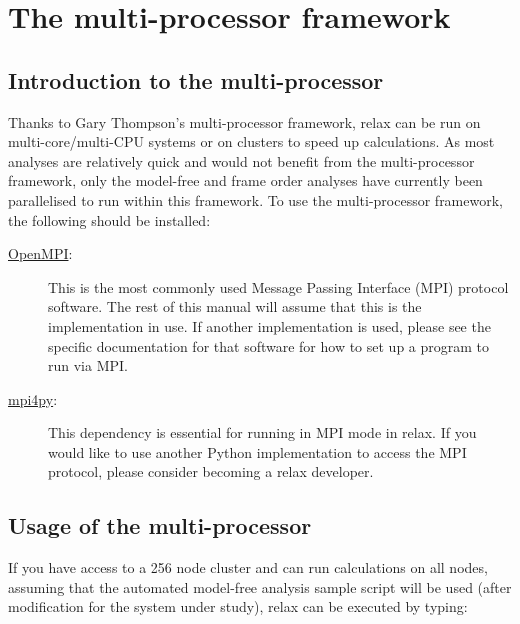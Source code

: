 
\section{The multi-processor framework}




\subsection{Introduction to the multi-processor} \label{sect: multi-processor}

Thanks to Gary Thompson's multi-processor framework, relax can be run on multi-core/multi-CPU systems or on clusters to speed up calculations.  As most analyses are relatively quick and would not benefit from the multi-processor framework, only the model-free and frame order analyses have currently been parallelised to run within this framework.  To use the multi-processor framework, the following should be installed:

\begin{description}
\item[\href{http://www.open-mpi.org/}{OpenMPI}:]  This is the most commonly used Message Passing Interface (MPI) protocol software.  The rest of this manual will assume that this is the implementation in use.  If another implementation is used, please see the specific documentation for that software for how to set up a program to run via MPI.
\item[\href{http://mpi4py.scipy.org/}{mpi4py}:]  This dependency is essential for running in MPI mode in relax.  If you would like to use another Python implementation to access the MPI protocol, please consider becoming a relax developer.
\end{description}




\subsection{Usage of the multi-processor}

If you have access to a 256 node cluster and can run calculations on all nodes, assuming that the  automated model-free analysis sample script will be used (after modification for the system under study), relax can be executed by typing:

